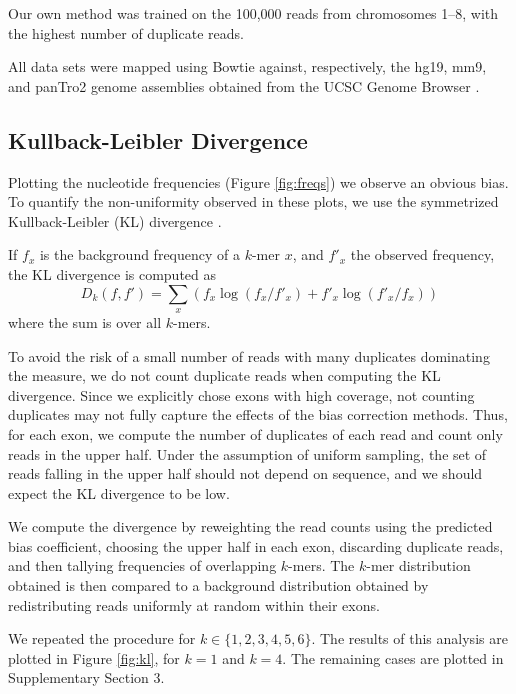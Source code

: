 \documentclass{bioinfo}
\begin{document}
Our own method was trained on the 100,000 reads from chromosomes 1--8, with the
highest number of duplicate reads.

All data sets were mapped using Bowtie \citep{Langmead2009} against,
respectively, the hg19, mm9, and panTro2 genome assemblies obtained from the
UCSC Genome Browser \citep{Karolchik2008}.



\subsection{Kullback-Leibler Divergence}



Plotting the nucleotide frequencies (Figure  \ref{fig:freqs}) we observe an
obvious bias. To quantify the non-uniformity observed in these plots, we use the
symmetrized Kullback-Leibler (KL) divergence \citep{Kullback1951}.

If $f_x$ is the background frequency of a $k$-mer $x$, and $f'_x$ the observed
frequency, the KL divergence is computed as
$$D_k( f, f' ) = \sum_{x} \left( f_x \log( f_x / f'_x ) + f'_x \log( f'_x / f_x) \right)$$
where the sum is over all $k$-mers.


To avoid the risk of a small number of reads with many duplicates dominating the
measure, we do not count duplicate reads when computing the KL divergence. Since we
explicitly chose exons with high coverage, not counting duplicates may not
fully capture the effects of the bias correction methods. Thus, for each exon,
we compute the number of duplicates of each read and count only reads in the
upper half. Under the assumption of uniform sampling, the set of reads falling
in the upper half should not depend on sequence, and we should expect the KL
divergence to be low.

We compute the divergence by reweighting the read counts using the predicted
bias coefficient, choosing the upper half in each exon, discarding duplicate
reads, and then tallying frequencies of overlapping $k$-mers. The $k$-mer
distribution obtained is then compared to a background distribution obtained by
redistributing reads uniformly at random within their exons.

We repeated the procedure for $k \in \{1, 2, 3, 4, 5, 6\}$. The results of this
analysis are plotted in Figure \ref{fig:kl}, for $k = 1$ and $k = 4$. The
remaining cases are plotted in Supplementary Section 3.
\end{document}
